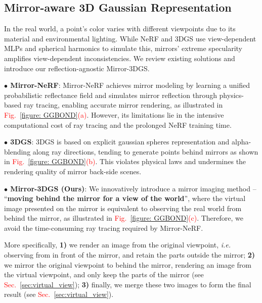 \documentclass[conference]{IEEEtran}
\begin{document}


\subsection{Mirror-aware 3D Gaussian Representation}
\label{sec:3.2}
In the real world, a point's color varies with different viewpoints due to its material and environmental lighting. While NeRF and 3DGS use view-dependent MLPs and spherical harmonics to simulate this, mirrors' extreme specularity amplifies view-dependent inconsistencies. We review existing solutions and introduce our reflection-agnostic Mirror-3DGS.

\textbf{$\bullet$ Mirror-NeRF}: Mirror-NeRF achieves mirror modeling by learning a unified probabilistic reflectance field and simulates mirror reflection through physics-based ray tracing, enabling accurate mirror rendering, as illustrated in \textcolor{red}{Fig.~\ref{figure: GGBOND}(a)}. However, its limitations lie in the intensive computational cost of ray tracing and the prolonged NeRF training time.

\textbf{$\bullet$  3DGS}: 3DGS is based on explicit gaussian spheres representation and alpha-blending along ray directions, tending to generate points behind mirrors as shown in \textcolor{red}{Fig.~\ref{figure: GGBOND}(b)}. This violates physical laws and undermines the rendering quality of mirror back-side scenes.


\textbf{$\bullet$  Mirror-3DGS (Ours)}: We innovatively introduce a mirror imaging method -- ``\textbf{moving behind the mirror for a view of the world}'', where the virtual image presented on the mirror is equivalent to observing the real world from behind the mirror, as illustrated in \textcolor{red}{Fig.~\ref{figure: GGBOND}(c)}. Therefore, we avoid the time-consuming ray tracing required by Mirror-NeRF. %

More specifically, \textbf{1)} we render an image from the original viewpoint, \textit{i.e.} observing from in front of the mirror, and retain the parts outside the mirror; \textbf{2)} we mirror the original viewpoint to behind the mirror, rendering an image from the virtual viewpoint, and only keep the parts of the mirror (see \textcolor{red}{Sec.~\ref{sec:virtual_view}}); \textbf{3)} finally, we merge these two images to form the final result (see \textcolor{red}{Sec.~\ref{sec:virtual_view}}).
\end{document}
